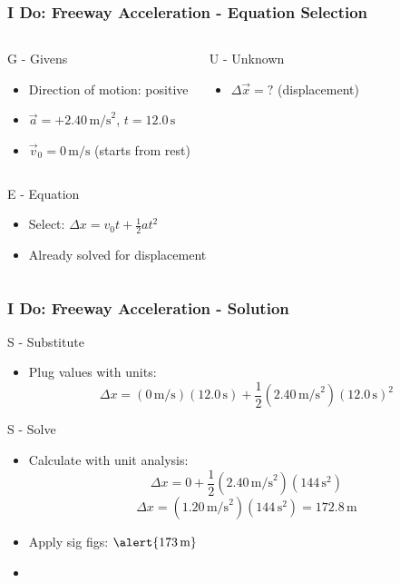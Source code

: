 \documentclass{beamer}
\begin{document}
\begin{frame}
\frametitle{I Do: Freeway Acceleration - Equation Selection}
\begin{columns}[T]
\begin{block}{G - Givens}
\begin{itemize}
\item Direction of motion: positive
\item $\vec{a} = +2.40 \, \text{m/s}^2$, $t = 12.0 \, \text{s}$
\item $\vec{v}_0 = 0 \, \text{m/s}$ (starts from rest)
\end{itemize}
\end{block}
\pause
{}
\begin{block}{U - Unknown}
\begin{itemize}
\item $\Delta \vec{x} = ?$ (displacement)
\end{itemize}
\end{block}
\end{columns}
\pause
\begin{columns}[T]
\begin{block}{E - Equation}
\begin{itemize}
\item Select: $\Delta x = v_0 t + \frac{1}{2}at^2$
\item Already solved for displacement
\end{itemize}
\end{block}
\end{columns}
\end{frame}

\begin{frame}
\frametitle{I Do: Freeway Acceleration - Solution}
\begin{block}{S - Substitute}
\begin{itemize}
\item Plug values with units:
\[ \Delta x = (0 \, \text{m/s})(12.0 \, \text{s}) + \frac{1}{2}(2.40 \, \text{m/s}^2)(12.0 \, \text{s})^2 \]
\end{itemize}
\end{block}
\pause
\begin{block}{S - Solve}
\begin{itemize}
\item Calculate with unit analysis:
\[ \Delta x = 0 + \frac{1}{2}(2.40 \, \text{m/s}^2)(144 \, \text{s}^2) \]
\[ \Delta x = (1.20 \, \text{m/s}^2)(144 \, \text{s}^2) = 172.8 \, \text{m} \]
\item Apply sig figs: $\alert{173 \, \text{m}}$
\item {}
\end{itemize}
\end{block}
\end{frame}
\end{document}
